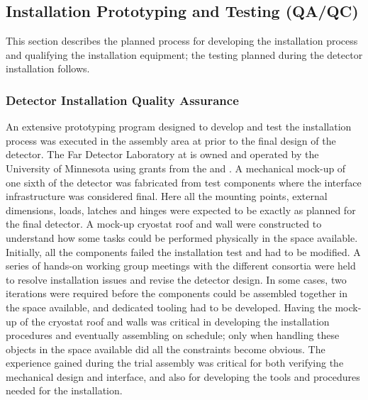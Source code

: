 



\subsection{Installation Prototyping and Testing (QA/QC)}
\label{sec:fdsp-tc-inst-qaqc}

This section describes the planned  process for developing the installation process and qualifying the installation equipment; the  testing planned during the detector installation follows. 

\subsubsection{Detector Installation Quality Assurance}

An extensive prototyping program designed to develop and test the  installation process was executed in the  assembly area at  prior to the final design of the  detector. 
The  Far Detector Laboratory at  is owned and operated by the University of Minnesota using grants from the  and .
A mechanical mock-up of one sixth of the detector was fabricated from test components where the interface infrastructure was considered final. 
Here all the mounting points, external dimensions, loads, latches and hinges were expected to be exactly as planned for the final  detector.
A mock-up cryostat roof and wall were constructed to understand how some tasks could  be performed physically in the space available.
Initially, all the components failed the installation test and had to be modified. A series of hands-on working group meetings with the different consortia were held to resolve installation issues and revise the detector design. 
In some cases, two iterations were required before the components could be assembled together in the space available, and dedicated tooling had to be developed. 
Having the mock-up of the cryostat roof and walls was critical in developing the installation procedures and eventually assembling  on schedule; only when handling these objects in the space available did all the constraints become obvious. 
The experience gained during the    trial assembly was critical for both verifying the mechanical design and interface, and also for developing the tools and procedures needed for the installation.

